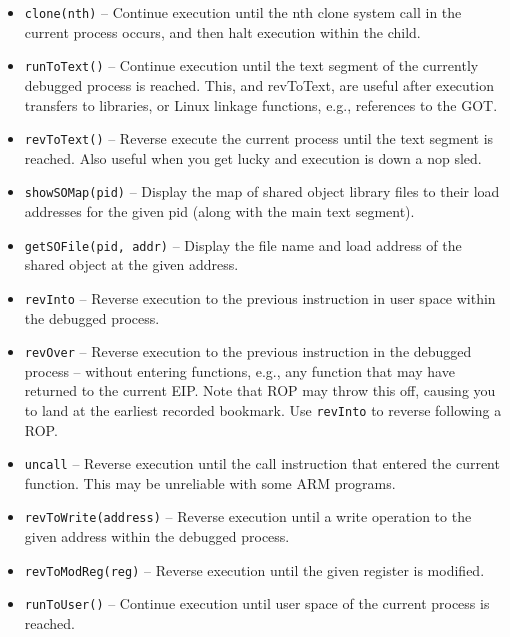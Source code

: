 \documentclass[titlepage]{article}
\begin{document}
\begin{itemize}
\item {\tt clone(nth)} – Continue execution until the nth clone system call in the current process occurs, and then halt execution within the child.

\item {\tt runToText()} – Continue execution until the text segment of the currently debugged process is reached.  This, and revToText, are useful after execution transfers to libraries, or Linux linkage functions, e.g., references to the GOT.

\item {\tt revToText()} – Reverse execute the current process until the text segment is reached.  Also useful when you get lucky and execution is down a nop sled.
 
\item {\tt showSOMap(pid)} – Display the map of shared object library files to their load addresses for the given pid (along with the main text segment).

\item {\tt getSOFile(pid, addr)} – Display the file name and load address of the shared object at the given address.

\item {\tt revInto} – Reverse execution to the previous instruction in user space within the debugged process. 

\item {\tt revOver} – Reverse execution to the previous instruction in the debugged process – without entering functions, e.g., any function that may have returned to the current EIP.  Note that ROP may throw this off, causing you to land at the earliest recorded bookmark.  Use {\tt revInto} to reverse following a ROP.

\item {\tt uncall} – Reverse execution until the call instruction that entered the current function.  This may be unreliable with some ARM
programs.

\item {\tt revToWrite(address)} – Reverse execution until a write operation to the given address within the debugged process.

\item {\tt revToModReg(reg)} – Reverse execution until the given register is modified.


\item {\tt runToUser()} – Continue execution until user space of the current process is reached.


\end{itemize}
\end{document}
